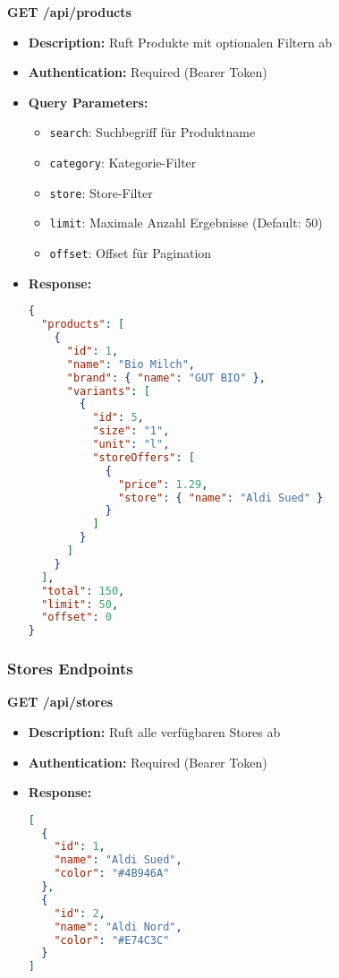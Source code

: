 \textbf{GET /api/products}
\begin{itemize}
    \item \textbf{Description:} Ruft Produkte mit optionalen Filtern ab
    \item \textbf{Authentication:} Required (Bearer Token)
    \item \textbf{Query Parameters:}
    \begin{itemize}
        \item \texttt{search}: Suchbegriff für Produktname
        \item \texttt{category}: Kategorie-Filter
        \item \texttt{store}: Store-Filter
        \item \texttt{limit}: Maximale Anzahl Ergebnisse (Default: 50)
        \item \texttt{offset}: Offset für Pagination
    \end{itemize}
    \item \textbf{Response:}
    \begin{lstlisting}[language=JSON]
{
  "products": [
    {
      "id": 1,
      "name": "Bio Milch",
      "brand": { "name": "GUT BIO" },
      "variants": [
        {
          "id": 5,
          "size": "1",
          "unit": "l",
          "storeOffers": [
            {
              "price": 1.29,
              "store": { "name": "Aldi Sued" }
            }
          ]
        }
      ]
    }
  ],
  "total": 150,
  "limit": 50,
  "offset": 0
}
    \end{lstlisting}
\end{itemize}

\subsubsection{Stores Endpoints}

\textbf{GET /api/stores}
\begin{itemize}
    \item \textbf{Description:} Ruft alle verfügbaren Stores ab
    \item \textbf{Authentication:} Required (Bearer Token)
    \item \textbf{Response:}
    \begin{lstlisting}[language=JSON]
[
  {
    "id": 1,
    "name": "Aldi Sued",
    "color": "#4B946A"
  },
  {
    "id": 2,
    "name": "Aldi Nord", 
    "color": "#E74C3C"
  }
]
    \end{lstlisting}
\end{itemize}

